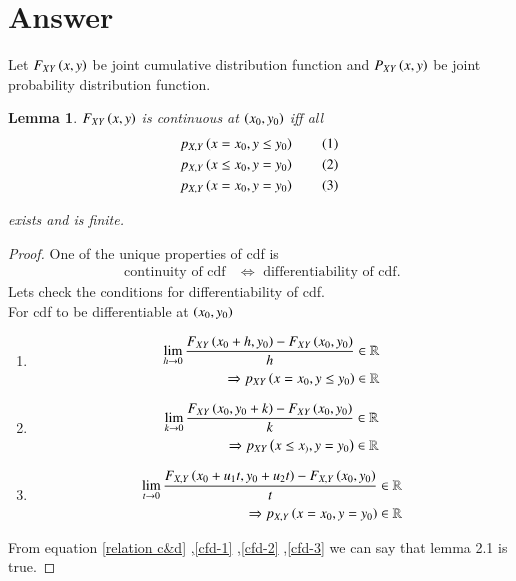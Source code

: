 \documentclass[journal,12pt,twocolumn]{IEEEtran}
\newtheorem{lemma}[theorem]{Lemma}
\begin{document}
\section{Answer}
Let $F_{XY}\left(x,y\right)$ be joint cumulative distribution function and $P_{XY}\left(x,y\right)$ be joint probability distribution function.\\
\begin{lemma}
$F_{XY}\left(x,y\right)$ is continuous at $\left(x_0,y_0\right)$ iff all
\begin{align*}
p_{X,Y}\left(x=x_0,y \leq y_0\right) \label{2.1-1} \tag{1}\\
p_{X,Y}\left(x \leq x_0,y = y_0\right)\label{2.1-2} \tag{2}\\
p_{X,Y}\left(x=x_0,y = y_0\right)\label{2.1-3} \tag{3}
\end{align*}

exists and is finite.
\end{lemma}
\begin{proof}
One of the unique properties of cdf is 
\begin{align}
\text{ continuity of cdf} &\Leftrightarrow \text{ differentiability of cdf}\label{relation c&d}.
\end{align}
Lets check the conditions for differentiability of cdf.\\
For cdf to be differentiable at $\left(x_0,y_0\right)$
\begin{enumerate}
\item 
\begin{align}
\lim_{h \rightarrow 0} \frac{F_{XY}\left(x_0+h,y_0\right)-F_{XY}\left(x_0,y_0\right)}{h} & \in \mathbb{R} \nonumber \\
\Rightarrow p_{XY}\left(x=x_0,y \leq y_0\right) & \in \mathbb{R} \label{cfd-1} 
\end{align}
\item 
\begin{align}
\lim_{k \rightarrow 0} \frac{F_{XY}\left(x_0,y_0+k\right)-F_{XY}\left(x_0,y_0\right)}{k} &\in \mathbb{R} \nonumber \\
\Rightarrow p_{XY}\left(x \leq x_),y=y_0\right) & \in \mathbb{R} \label{cfd-2}
\end{align}
\item 
\begin{align}
\lim_{t \rightarrow 0} \frac{F_{X,Y}\left(x_0+u_1 t,y_0 + u_2 t\right)-F_{X,Y}\left(x_0,y_0\right)}{t} &\in \mathbb{R} \nonumber \\
\Rightarrow p_{X,Y}\left(x=x_0,y=y_0\right) &\in \mathbb{R} \label{cfd-3}
\end{align}
\end{enumerate}
From equation \ref{relation c&d} ,\ref{cfd-1} ,\ref{cfd-2} ,\ref{cfd-3} we can say that lemma 2.1 is true.
\end{proof}
\end{document}
